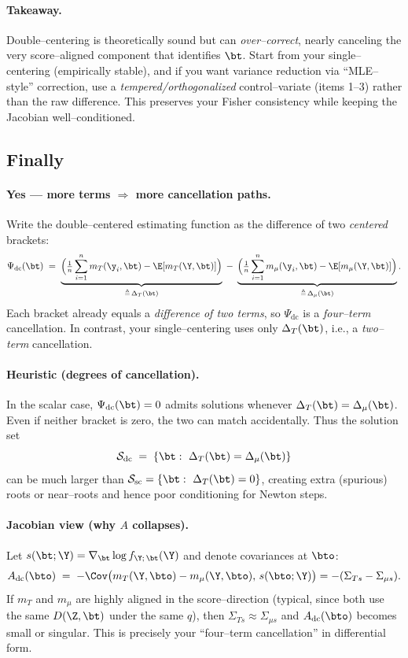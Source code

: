 \paragraph{Takeaway.} 
Double–centering is theoretically sound but can \emph{over–correct}, nearly canceling the very score–aligned component that identifies $\bt$. Start from your single–centering (empirically stable), and if you want variance reduction via “MLE–style” correction, use a \emph{tempered/orthogonalized} control–variate (items 1–3) rather than the raw difference. This preserves your Fisher consistency while keeping the Jacobian well–conditioned.



\subsection{Finally}

\paragraph{Yes — more terms $\Rightarrow$ more cancellation paths.}
Write the double–centered estimating function as the difference of two \emph{centered} brackets:
\[
\Psi_{\mathrm{dc}}(\bt)
\;=\;\underbrace{\Big(\tfrac{1}{n}\sum_{i=1}^n m_T(\y_i,\bt)-\E[m_T(\Y,\bt)]\Big)}_{\triangleq\,\Delta_T(\bt)}
\;-\;
\underbrace{\Big(\tfrac{1}{n}\sum_{i=1}^n m_\mu(\y_i,\bt)-\E[m_\mu(\Y,\bt)]\Big)}_{\triangleq\,\Delta_\mu(\bt)}.
\]
Each bracket already equals a \emph{difference of two terms}, so $\Psi_{\mathrm{dc}}$ is a \emph{four–term} cancellation. In contrast, your single–centering uses only $\Delta_T(\bt)$, i.e., a \emph{two–term} cancellation.

\paragraph{Heuristic (degrees of cancellation).}
In the scalar case, $\Psi_{\mathrm{dc}}(\bt)=0$ admits solutions whenever $\Delta_T(\bt)=\Delta_\mu(\bt)$.
Even if neither bracket is zero, the two can match accidentally. Thus the solution set
\[
\mathcal S_{\mathrm{dc}}\;=\;\{\bt:\ \Delta_T(\bt)=\Delta_\mu(\bt)\}
\]
can be much larger than 
$\mathcal S_{\mathrm{sc}}=\{\bt:\ \Delta_T(\bt)=0\}$,
creating extra (spurious) roots or near–roots and hence poor conditioning for Newton steps.

\paragraph{Jacobian view (why $A$ collapses).}
Let $s(\bt;\Y)=\nabla_\bt\log f_{\Y;\,\bt}(\Y)$ and denote covariances at $\bto$:
\[
A_{\mathrm{dc}}(\bto)\;=\;-\Cov\big(m_T(\Y,\bto)-m_\mu(\Y,\bto),\,s(\bto;\Y)\big)
=-(\Sigma_{Ts}-\Sigma_{\mu s}).
\]
If $m_T$ and $m_\mu$ are highly aligned in the score–direction (typical, since both use the same $D(\Z,\bt)$ under the same $q$), then $\Sigma_{Ts}\approx\Sigma_{\mu s}$ and $A_{\mathrm{dc}}(\bto)$ becomes small or singular. This is precisely your “four–term cancellation” in differential form.

